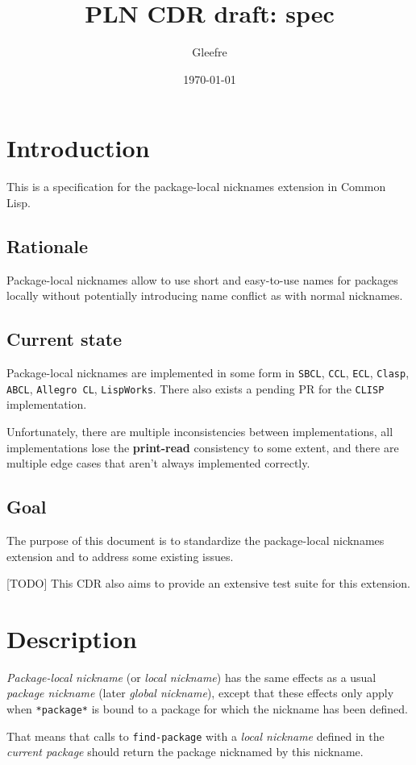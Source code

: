 \documentclass[11pt]{article}
\author{Gleefre}
\date{\today}
\title{PLN CDR draft: spec}
\begin{document}
\maketitle

\section{Introduction}
\label{sec:orged49c1b}
This is a specification for the package-local nicknames extension in Common Lisp.
\subsection{Rationale}
\label{sec:org3ac9dd8}
Package-local nicknames allow to use short and easy-to-use names for packages
locally without potentially introducing name conflict as with normal nicknames.
\subsection{Current state}
\label{sec:orgeda2802}
Package-local nicknames are implemented in some form in \texttt{SBCL}, \texttt{CCL}, \texttt{ECL},
\texttt{Clasp}, \texttt{ABCL}, \texttt{Allegro CL}, \texttt{LispWorks}. There also exists a pending PR for the
\texttt{CLISP} implementation.

Unfortunately, there are multiple inconsistencies between implementations, all
implementations lose the \textbf{print-read} consistency to some extent, and there are
multiple edge cases that aren't always implemented correctly.
\subsection{Goal}
\label{sec:org284158d}
The purpose of this document is to standardize the package-local nicknames
extension and to address some existing issues.

[TODO] This CDR also aims to provide an extensive test suite for this extension.
\section{Description}
\label{sec:org82ea024}
\emph{Package-local nickname} (or \emph{local nickname}) has the same effects as a usual
\emph{package nickname} (later \emph{global nickname}), except that these effects only apply
when \texttt{*package*} is bound to a package for which the nickname has been defined.

That means that calls to \texttt{find-package} with a \emph{local nickname} defined in the
\emph{current package} should return the package nicknamed by this nickname.
\end{document}
